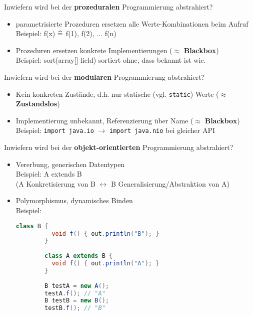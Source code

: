 \begin{card}
	Inwiefern wird bei der \textbf{prozeduralen} Programmierung abstrahiert?
	\hr
	\begin{itemize}
	\item parametrisierte Prozeduren ersetzen alle Werte-Kombinationen beim Aufruf\\
		Beispiel: f(x) $\mathrel{\widehat{=}}$ f(1), f(2), ... f(n)
	\item Prozeduren ersetzen konkrete Implementierungen ($\approx$ \textbf{Blackbox})\\
		Beispiel: sort(array[] field) sortiert ohne, dass bekannt ist wie.
	\end{itemize}
\end{card}

\begin{card}
	Inwiefern wird bei der \textbf{modularen} Programmierung abstrahiert?
	\hr
	\begin{itemize}
	\item Kein konkreten Zustände, d.h. nur statische (vgl. \texttt{static}) Werte ($\approx$ \textbf{Zustandslos})
	\item Implementierung unbekannt, Referenzierung über Name ($\approx$ \textbf{Blackbox})\\
		Beispiel: \texttt{import java.io} $\rightarrow$ \texttt{import java.nio} bei gleicher API
	\end{itemize}
\end{card}

\begin{card}
	Inwiefern wird bei der \textbf{objekt-orientierten} Programmierung abstrahiert?
	\hr
	\begin{itemize}
	\item Vererbung, generischen Datentypen\\
			Beispiel: A extends B\\
			(A Konkretisierung  von B $\leftrightarrow$ B Generalisierung/Abstraktion von A)
	\item Polymorphismus, dynamisches Binden\\
		Beispiel:
		\begin{lstlisting}[language=Java]
		class B {
		  void f() { out.println("B"); }
		}
		
		class A extends B {
		  void f() { out.println("A"); }
		}
		
		B testA = new A();
		testA.f(); // "A"
		B testB = new B();
		testB.f(); // "B"
		\end{lstlisting}
	\end{itemize}
\end{card}

